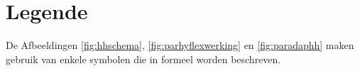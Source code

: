 \section{Legende}

De Afbeeldingen \ref{fig:hhschema}, \ref{fig:parhyflexwerking} en \ref{fig:paradaphh} maken gebruik van enkele symbolen die in  formeel worden beschreven.

